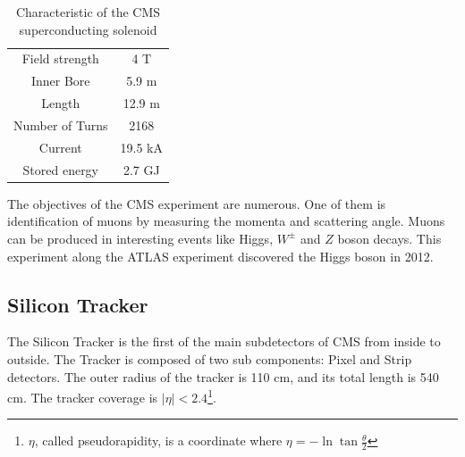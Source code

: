 \begin{table}[ht]
	\caption[Characteristic of the CMS superconducting solenoid]{Characteristic of the CMS superconducting solenoid\cite{cms-manual}}
	\centering
	\begin{tabular}{|c|c|}
		\hline
		Field strength & 4 T \\
		Inner Bore & 5.9 m \\
		Length & 12.9 m\\
		Number of Turns & 2168\\
		Current & 19.5 kA\\
		Stored energy & 2.7 GJ\\
		\hline
	\end{tabular}
	\label{tab:my_label}
\end{table}




 The objectives of the CMS experiment are numerous. One of them is
identification of muons by measuring the momenta and scattering angle. Muons can be produced in interesting events like Higgs, $W^{\pm}$ and $Z$ boson decays.%
This experiment along the ATLAS experiment discovered the Higgs boson in 2012.


\subsection{Silicon Tracker}
The Silicon Tracker is the first of the main subdetectors of CMS from inside to outside. The Tracker is composed of two sub components: Pixel and Strip detectors. The outer radius of the tracker is 110 cm, and its total length is 540 cm. The tracker coverage is $|\eta|<2.4$\footnote{$\eta$, called pseudorapidity, is a coordinate where $\eta=-\ln{\tan{\frac{\theta}{2}}}$}.

